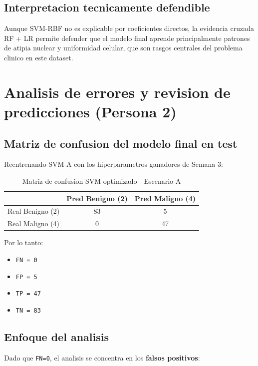 \documentclass[11pt,a4paper]{article}
\begin{document}
\subsection{Interpretacion tecnicamente defendible}

Aunque SVM-RBF no es explicable por coeficientes directos, la evidencia cruzada RF + LR permite defender que el modelo final aprende principalmente patrones de atipia nuclear y uniformidad celular, que son rasgos centrales del problema clinico en este dataset.

\section{Analisis de errores y revision de predicciones (Persona 2)}

\subsection{Matriz de confusion del modelo final en test}

Reentrenando SVM-A con los hiperparametros ganadores de Semana 3:

\begin{table}[H]
\centering
\caption{Matriz de confusion SVM optimizado - Escenario A}
\begin{tabular}{lcc}
\toprule
 & Pred Benigno (2) & Pred Maligno (4) \\
\midrule
Real Benigno (2) & 83 & 5 \\
Real Maligno (4) & 0 & 47 \\
\bottomrule
\end{tabular}
\end{table}

Por lo tanto:

\begin{itemize}[leftmargin=1.2cm]
\item \texttt{FN = 0}
\item \texttt{FP = 5}
\item \texttt{TP = 47}
\item \texttt{TN = 83}
\end{itemize}

\subsection{Enfoque del analisis}

Dado que \texttt{FN=0}, el analisis se concentra en los \textbf{falsos positivos}:
\end{document}
